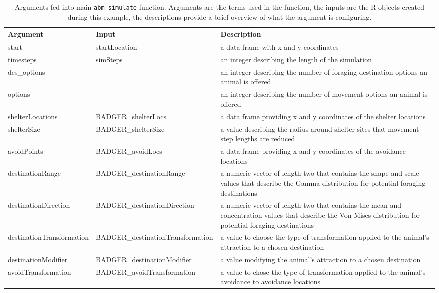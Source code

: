 \documentclass[10pt,a4paper]{article}
\begin{document}
\begin{table}
\centering
\caption{\label{tab:arguementTable}Arguments fed into main \texttt{abm\_simulate} function. Arguments are the terms used in the function, the inputs are the R objects created during this example, the descriptions provide a brief overview of what the argument is configuring.}
\centering
\fontsize{10}{12}\selectfont
\begin{tabular}[t]{>{\raggedright\arraybackslash}p{11em}>{\raggedright\arraybackslash}p{16em}>{\raggedright\arraybackslash}p{22em}}
\toprule
Argument & Input & Description\\
\midrule
start & startLocation & a data frame with x and y coordinates\\
timesteps & simSteps & an integer describing the length of the simulation\\
des\_options & 10 & an integer describing the number of foraging destination options an animal is offered\\
options & 12 & an integer describing the number of movement options an animal is offered\\
shelterLocations & BADGER\_shelterLocs & a data frame providing x and y coordinates of the shelter locations\\
\addlinespace
shelterSize & BADGER\_shelterSize & a value describing the radius around shelter sites that movement step lengths are reduced\\
avoidPoints & BADGER\_avoidLocs & a data frame providing x and y coordinates of the avoidance locations\\
destinationRange & BADGER\_destinationRange & a numeric vector of length two that contains the shape and scale values that describe the Gamma distribution for potential foraging destinations\\
destinationDirection & BADGER\_destinationDirection & a numeric vector of length two that contains the mean and concentration values that describe the Von Mises distribution for potential foraging destinations\\
destinationTransformation & BADGER\_destinationTransformation & a value to choose the type of transformation applied to the animal's attraction to a chosen destination\\
\addlinespace
destinationModifier & BADGER\_destinationModifier & a value modifying the animal's attraction to a chosen destination\\
avoidTransformation & BADGER\_avoidTransformation & a value to chose the type of transformation applied to the animal's avoidance to avoidance locations\\

\end{tabular}
\end{table}
\end{document}
